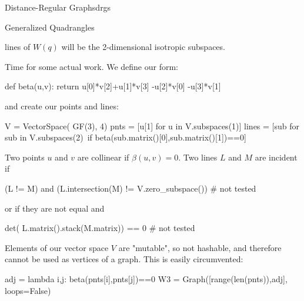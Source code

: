 \begin{chap}{Distance-Regular Graphs}{drgs}
\begin{sect}{Generalized Quadrangles}
\begin{para}
lines of $W(q)$ will be the 2-dimensional isotropic subspaces.
\end{para}
%
\begin{para}
Time for some actual work. We define our form:
\end{para}
%
\begin{sagecode}
\begin{sageinput}
def beta(u,v):
    return u[0]*v[2]+u[1]*v[3] -u[2]*v[0] -u[3]*v[1]
\end{sageinput}
\end{sagecode}
%
\begin{para}
and create our points and lines:
\end{para}
%
\begin{sagecode}
\begin{sageinput}
V = VectorSpace( GF(3), 4)
pnts = [u[1] for u in V.subspaces(1)]
lines = [sub for sub in V.subspaces(2)\
    if beta(sub.matrix()[0],sub.matrix()[1])==0]
\end{sageinput}
\end{sagecode}
%
\begin{para}
Two points $u$ and $v$ are collinear if $\beta(u,v)=0$. Two lines $L$ and $M$ 
are incident if
\end{para}
%
\begin{sagecode}
\begin{sageinput}
(L != M) and (L.intersection(M) != V.zero_subspace()) # not tested
\end{sageinput}
\end{sagecode}
%
\begin{para}
or if they are not equal and
\end{para}
%
\begin{sagecode}
\begin{sageinput}
det( L.matrix().stack(M.matrix)) == 0 # not tested
\end{sageinput}
\end{sagecode}
%
\begin{para}
Elements of our vector space $V$ are "mutable", so not hashable, 
and therefore cannot be used as vertices of a graph. This is easily circumvented:
\end{para}
%
\begin{sagecode}
\begin{sageinput}
adj = lambda i,j: beta(pnts[i],pnts[j])==0
W3 = Graph([range(len(pnts)),adj], loops=False)
\end{sageinput}
\end{sagecode}
%
\begin{para}

\end{para}
\end{sect}
\end{chap}
